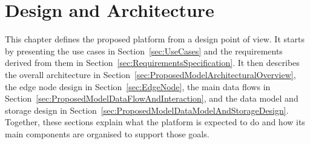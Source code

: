 
%

\chapter{Design and Architecture}
\label{cha:ArchitectureAndDesign}

This chapter defines the proposed platform from a design point of view. It starts by presenting the use cases in Section~\ref{sec:UseCases} and the requirements derived from them in Section~\ref{sec:RequirementsSpecification}. It then describes the overall architecture in Section~\ref{sec:ProposedModelArchitecturalOverview}, the edge node design in Section~\ref{sec:EdgeNode}, the main data flows in Section~\ref{sec:ProposedModelDataFlowAndInteraction}, and the data model and storage design in Section~\ref{sec:ProposedModelDataModelAndStorageDesign}. Together, these sections explain what the platform is expected to do and how its main components are organised to support those goals.







